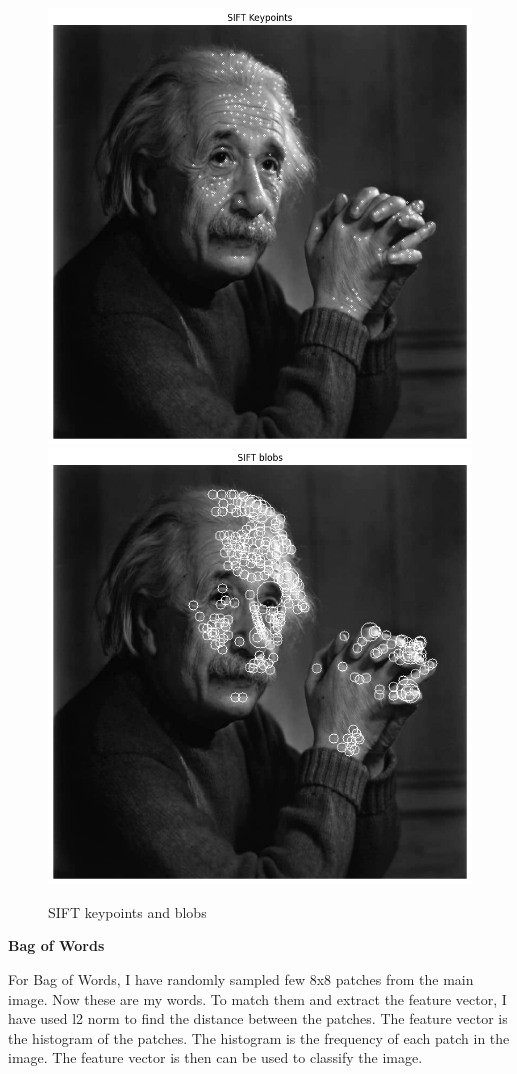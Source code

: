 \begin{figure}[H]
    \centering
    \includegraphics[width=.33\textwidth]{res/sift_keypoints.png}
    \includegraphics[width=.33\textwidth]{res/sift_blobs.png}
    \caption{SIFT keypoints and blobs}
    \label{fig:1.2}
\end{figure}


\newpage

\textbf{Bag of Words}

For Bag of Words, I have randomly sampled few 8x8 patches from the main image. Now these are my words. To match them and extract the feature vector, I have used l2 norm to find the distance between the patches. The feature vector is the histogram of the patches. The histogram is the frequency of each patch in the image. The feature vector is then can be used to classify the image.

